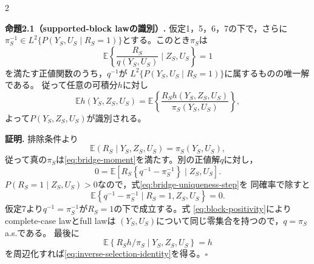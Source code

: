 \documentclass[a4paper,10pt]{article}
\newcommand{\E}{\mathbb E}
\begin{document}
\begin{multicols}{2}
\begin{center}
\begin{minipage}{\linewidth}
\centering
\resizebox{\linewidth}{!}{}
\label{fig:supported-blocks-dag}
\end{minipage}
\end{center}

\noindent\textbf{命題2.1（supported-block lawの識別）.}
仮定1，5，6，7の下で，さらに
$\pi_S^{-1}\in L^2\{P(Y_S,U_S\mid R_S=1)\}$とする。このとき$\pi_S$は
\begin{equation}
\E\left\{\frac{R_S}{q(Y_S,U_S)}\mid Z_S,U_S\right\}=1
\label{eq:bridge-moment}
\end{equation}
を満たす正値関数のうち，$q^{-1}$が
$L^2\{P(Y_S,U_S\mid R_S=1)\}$に属するものの唯一解である。
従って任意の可積分$h$に対し
\begin{equation}
\E h(Y_S,Z_S,U_S)
=\E\left\{\frac{R_Sh(Y_S,Z_S,U_S)}{\pi_S(Y_S,U_S)}\right\},
\label{eq:inverse-selection-identity}
\end{equation}
よって$P(Y_S,Z_S,U_S)$が識別される。

\noindent\textbf{証明.}
排除条件より
\begin{equation}
\E(R_S\mid Y_S,Z_S,U_S)=\pi_S(Y_S,U_S),
\label{eq:selection-expectation}
\end{equation}
従って真の$\pi_S$は\eqref{eq:bridge-moment}を満たす。別の正値解$q$に対し，
\begin{equation}
0=\E\left[R_S\left\{q^{-1}-\pi_S^{-1}\right\}\mid Z_S,U_S\right].
\label{eq:bridge-uniqueness-step}
\end{equation}
$P(R_S=1\mid Z_S,U_S)>0$なので，式\eqref{eq:bridge-uniqueness-step}を
同確率で除すと
\begin{equation}
\E\left\{q^{-1}-\pi_S^{-1}\mid R_S=1,Z_S,U_S\right\}=0.
\label{eq:complete-case-bridge-uniqueness}
\end{equation}
仮定7より$q^{-1}=\pi_S^{-1}$が$R_S=1$の下で成立する。式
\eqref{eq:block-positivity}によりcomplete-case lawとfull lawは
$(Y_S,U_S)$について同じ零集合を持つので，$q=\pi_S$ a.s.である。
最後に
\begin{equation}
\E\left\{R_Sh/\pi_S\mid Y_S,Z_S,U_S\right\}=h
\label{eq:ipw-conditional-identity}
\end{equation}
を周辺化すれば\eqref{eq:inverse-selection-identity}を得る。\hfill$\square$


\end{multicols}
\end{document}
